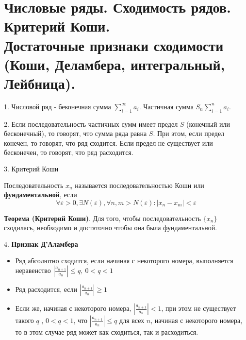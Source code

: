 \section{
	Числовые ряды. Сходимость рядов. Критерий Коши. \\
    Достаточные признаки сходимости (Коши, Деламбера, интегральный, Лейбница). 
}

1. Числовой ряд - беконечная сумма $\displaystyle \sum _{{i=1}}^{{\infty }}a_{i}$. Частичная сумма $\displaystyle S_n  \sum _{{i=1}}^{{n}}a_{i}$. 

2. Если последовательность частичных сумм имеет предел ${\displaystyle S}$ (конечный или бесконечный), 
то говорят, что сумма ряда равна ${\displaystyle S.}$ При этом, если предел конечен, то говорят, что ряд сходится. 
Если предел не существует или бесконечен, то говорят, что ряд расходится.

3. Критерий Коши

Последовательность ${\displaystyle x_{n}}$ называется последовательностью Коши или \textbf{фундаментальной}, если 
$${\displaystyle \forall \varepsilon >0,\exists N(\varepsilon ),\forall n,m>N(\varepsilon ):\mid x_{n}-x_{m}\mid <\varepsilon }$$

\textbf{Теорема (Критерий Коши)}. Для того, чтобы последовательность ${\displaystyle \{{x_{n}\}}}$ сходилась, 
необходимо и достаточно чтобы она была фундаментальной.

4. \textbf{Признак Д'Аламбера}
\begin{itemize}
    \item Ряд абсолютно сходится, если начиная с некоторого номера, выполняется неравенство
    ${\displaystyle \left|{\frac {a_{n+1}}{a_{n}}}\right|\leqslant q,~0<q<1}$
    \item Ряд расходится, если ${\displaystyle \left|{\frac {a_{n+1}}{a_{n}}}\right|\geqslant 1}$
    \item Если же, начиная с некоторого номера, 
    ${\displaystyle \left|{\frac {a_{n+1}}{a_{n}}}\right|<1}$, при этом не существует такого ${\displaystyle q}$ , 
    ${\displaystyle 0<q<1}$, что ${\displaystyle \left|{\frac {a_{n+1}}{a_{n}}}\right|\leqslant q}$ для всех ${\displaystyle n}$, 
    начиная с некоторого номера, то в этом случае ряд может как сходиться, так и расходиться.
\end{itemize}

